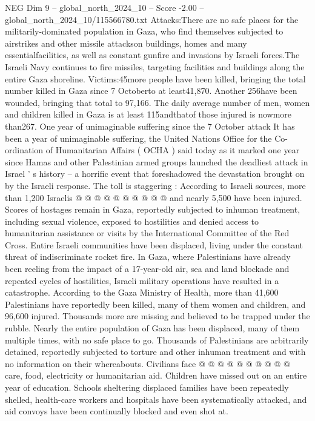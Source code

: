 \begin{textsample}{NEG Dim 9 – global\_north\_2024\_10 – Score -2.00 – global\_north\_2024\_10/115566780.txt}  \label{ex:f9_neg_226}
Attacks:There are no safe places for the militarily-dominated population in Gaza, who find themselves subjected to airstrikes and other missile attackson buildings, homes and many essentialfacilities, as well as constant gunfire and invasions by Israeli forces.The Israeli Navy continues to fire missiles, targeting facilities and buildings along the entire Gaza shoreline.
Victims:45more people have been killed, bringing the total number killed in Gaza since 7 Octoberto at least41,870.
Another 256have been wounded, bringing that total to 97,166.
The daily average number of men, women and children killed in Gaza is at least 115andthatof those injured is nowmore than267.
One year of unimaginable suffering since the 7 October attack It has been a year of unimaginable suffering, the United Nations Office for the Co-ordination of Humanitarian Affairs ( OCHA ) said today as it marked one year since Hamas and other Palestinian armed groups launched the deadliest attack in Israel ' s history -- a horrific event that foreshadowed the devastation brought on by the Israeli response.
The toll is staggering : According to Israeli sources, more than 1,200 Israelis @ @ @ @ @ @ @ @ @ @ and nearly 5,500 have been injured.
Scores of hostages remain in Gaza, reportedly subjected to inhuman treatment, including sexual violence, exposed to hostilities and denied access to humanitarian assistance or visits by the International Committee of the Red Cross.
Entire Israeli communities have been displaced, living under the constant threat of indiscriminate rocket fire.
In Gaza, where Palestinians have already been reeling from the impact of a 17-year-old air, sea and land blockade and repeated cycles of hostilities, Israeli military operations have resulted in a catastrophe.
According to the Gaza Ministry of Health, more than 41,600 Palestinians have reportedly been killed, many of them women and children, and 96,600 injured.
Thousands more are missing and believed to be trapped under the rubble.
Nearly the entire population of Gaza has been displaced, many of them multiple times, with no safe place to go.
Thousands of Palestinians are arbitrarily detained, reportedly subjected to torture and other inhuman treatment and with no information on their whereabouts.
Civilians face @ @ @ @ @ @ @ @ @ @ care, food, electricity or humanitarian aid.
Children have missed out on an entire year of education.
Schools sheltering displaced families have been repeatedly shelled, health-care workers and hospitals have been systematically attacked, and aid convoys have been continually blocked and even shot at.

\end{textsample}
